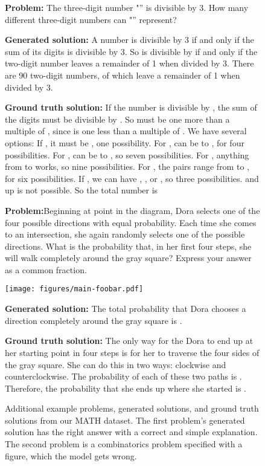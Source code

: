 \documentclass{article}
\begin{document}
\begin{figure*}[t]
\vspace{-15pt}
\textbf{Problem:} The three-digit number "'' is divisible by 3. How many different three-digit numbers can "'' represent?

\textbf{Generated solution:} A number is divisible by 3 if and only if the sum of its digits is divisible by 3. So  is divisible by  if and only if the two-digit number  leaves a remainder of 1 when divided by 3. There are 90 two-digit numbers, of which  leave a remainder of 1 when divided by 3.

\textbf{Ground truth solution:} If the number is divisible by , the sum of the digits must be divisible by .  So  must be one more than a multiple of , since  is one less than a multiple of .  We have several options:
If , it must be , one possibility.
For ,  can be  to , for four possibilities.
For ,  can be  to , so seven possibilities.
For , anything from  to  works, so nine possibilities.
For , the pairs range from  to , for six possibilities.
If , we can have , , or , so three possibilities.
 and up is not possible.
So the total number is 

\hrulefill

\begin{minipage}{0.86\textwidth} 
\begin{flushleft}
\textbf{Problem:}\quad Beginning at point  in the diagram, Dora selects one of the four possible directions with equal probability. Each time she comes to an intersection, she again randomly selects one of the possible directions. What is the probability that, in her first four steps, she will walk completely around the gray square? Express your answer as a common fraction.
\end{flushleft}
\end{minipage}\hfill \begin{minipage}{0.14\textwidth} 
\begin{flushright}
\texttt{[image: figures/main-foobar.pdf]}
\end{flushright}
\end{minipage}

\textbf{Generated solution:} The total probability that Dora chooses a direction completely around the gray square is .

\textbf{Ground truth solution:} The only way for the Dora to end up at her starting point in four steps is for her to traverse the four sides of the gray square.  She can do this in two ways: clockwise and counterclockwise. The probability of each of these two paths is .  Therefore, the probability that she ends up where she started is .





\caption{Additional example problems, generated solutions, and ground truth solutions from our MATH dataset. The first problem's generated solution has the right answer with a correct and simple explanation. The second problem is a combinatorics problem specified with a figure, which the model gets wrong.}
\label{fig:generated_examples2}
\vspace{-5pt}
\end{figure*}
\end{document}

